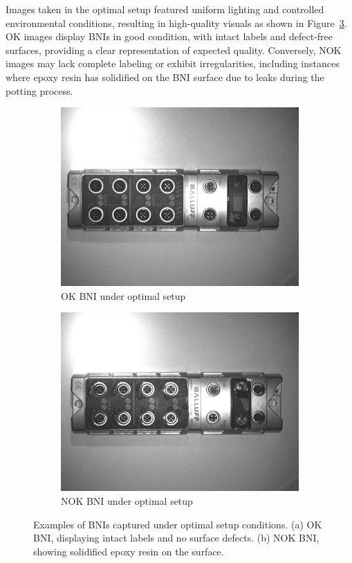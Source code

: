 \documentclass[12pt,DIV14,BCOR12mm,a4paper,footinclude=false,headinclude,parskip=half-,twoside,openright,cleardoublepage=empty,toc=index,bibliography=totoc,listof=totoc]{scrreprt}
\numberwithin{equation}{chapter}
\begin{document}
Images taken in the optimal setup featured uniform lighting and controlled environmental conditions, resulting in high-quality visuals as shown in Figure~\ref{fig:optimal_setup_bnis}. OK images display BNIs in good condition, with intact labels and defect-free surfaces, providing a clear representation of expected quality. Conversely, NOK images may lack complete labeling or exhibit irregularities, including instances where epoxy resin has solidified on the BNI surface due to leaks during the potting process.
\begin{figure}
    \centering
    \begin{subfigure}[b]{0.45\textwidth}
        \centering
        \includegraphics[scale=0.15]{../media/BNI-optimal-OK.png}
        \caption{OK BNI under optimal setup}
        \label{fig:bni_ok}
    \end{subfigure}
    \hfill
    \begin{subfigure}[b]{0.45\textwidth}
        \centering
        \includegraphics[scale=0.15]{../media/BNI-optimal-NOK.png}
        \caption{NOK BNI under optimal setup}
        \label{fig:bni_nok}
    \end{subfigure}
    \caption{Examples of BNIs captured under optimal setup conditions. (a) OK BNI, displaying intact labels and no surface defects. (b) NOK BNI, showing solidified epoxy resin on the surface.}
    \label{fig:optimal_setup_bnis}
\end{figure}
\end{document}
